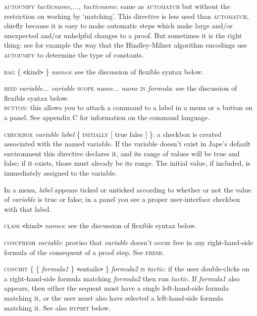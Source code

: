 \documentclass[11pt]{book}
\newcommand{\tab}{\hspace{5mm}}
\begin{document}
\textsc{autounify} \textit{tacticname,..., tacticname}: same as \textsc{automatch} but without the restriction on working by `matching'. This directive is less used than \textsc{automatch}, chiefly because it is easy to make automatic steps which make large and/or unexpected and/or unhelpful changes to a proof. But sometimes it is the right thing: see for example the way that the Hindley-Milner algorithm encodings use \textsc{autounify} to determine the type of constants.


\textsc{bag \{} \texttt{<}kind\texttt{>} \textsc{\}} \textit{names}: see the discussion of flexible syntax below.


\textsc{bind} \textit{variable... variable} \textsc{scope} \textit{name... name} \textsc{in} \textit{formula}: see the discussion of flexible syntax below.\\
\textsc{button:} this allows you to attach a command to a label in a menu or a button on a panel. See appendix C for information on the command language.


\textsc{checkbox} \textit{variable label} \{ \textsc{initially [} true {\textbar} false ] \}: a checkbox is created associated with the named variable. If the variable doesn't exist in Jape's default environment this directive declares it, and its range of values will be true and false; if it exists, those must already be its range. The initial value, if included, is immediately assigned to the variable.


\tab In a menu, \textit{label} appears ticked or unticked according to whether or not the value of \textit{variable} is true or false; in a panel you see a proper user-interface checkbox with that label.


\textsc{class}  \texttt{<}kind\texttt{>} \textit{names}: see the discussion of flexible syntax below.


\textsc{concfresh} \textit{variable}: proviso that \textit{variable} doesn't occur free in any right-hand-side formula of the consequent of a proof step. See \textsc{fresh}.


\textsc{conchit} \{ \{ \textit{formula1} \} \texttt{<}entails\texttt{>} \} \textit{formula2} \textsc{is} \textit{tactic}: if the user double-clicks on a right-hand-side formula matching \textit{formula2} then run \textit{tactic}. If \textit{formula1} also appears, then either the sequent must have a single left-hand-side formula matching it, or the user must also have selected a left-hand-side formula matching it. See also \textsc{hyphit} below.
\end{document}

